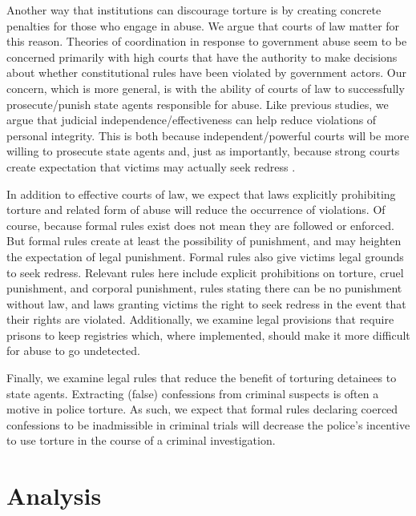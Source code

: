 \documentclass[12pt]{article}
\begin{document}
Another way that institutions can discourage torture is by creating concrete penalties for those who engage in abuse. We argue that courts of law matter for this reason. Theories of coordination in response to government abuse seem to be concerned primarily with high courts that have the authority to make decisions about whether constitutional rules have been violated by government actors. Our concern, which is more general, is with the ability of courts of law to successfully prosecute/punish state agents responsible for abuse. Like previous studies, we argue that judicial independence/effectiveness can help reduce violations of personal integrity. This is both because independent/powerful courts will be more willing to prosecute state agents and, just as importantly, because strong courts create expectation that victims may actually seek redress \citep{PowellStaton2009}. 

In addition to effective courts of law, we expect that laws explicitly prohibiting torture and related form of abuse will reduce the occurrence of violations. Of course, because formal rules exist does not mean they are followed or enforced. But formal rules create at least the possibility of punishment, and may heighten the expectation of legal punishment. Formal rules also give victims legal grounds to seek redress. Relevant rules here include explicit prohibitions on torture, cruel punishment, and corporal punishment, rules stating there can be no punishment without law, and laws granting victims the right to seek redress in the event that their rights are violated. Additionally, we examine legal provisions that require prisons to keep registries which, where implemented, should make it more difficult for abuse to go undetected. 

Finally, we examine legal rules that reduce the benefit of torturing detainees to state agents. Extracting (false) confessions from criminal suspects is often a motive in police torture. As such, we expect that formal rules declaring coerced confessions to be inadmissible in criminal trials will decrease the police's incentive to use torture in the course of a criminal investigation. 

\section*{Analysis}

\clearpage
\begin{singlespace}


\end{singlespace}
\end{document}
